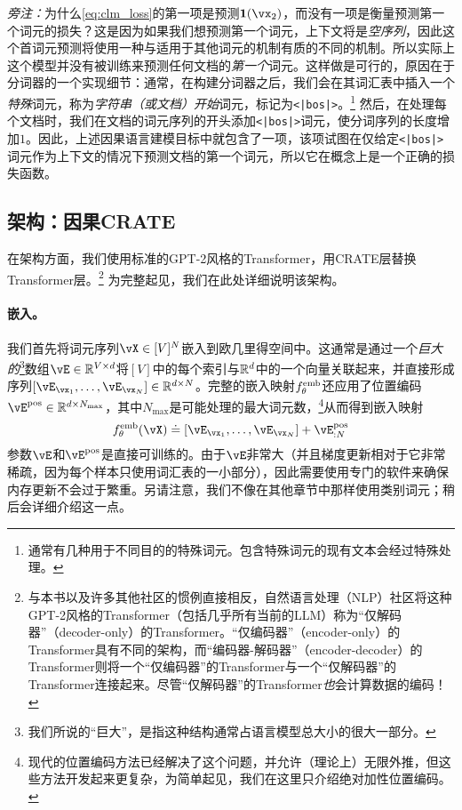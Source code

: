 \documentclass[../../book-main.tex]{subfiles}
\begin{document}
\textit{旁注：}为什么\eqref{eq:clm_loss}的第一项是预测\(\vone(\vx_{2})\)，而没有一项是衡量预测第一个词元的损失？这是因为如果我们想预测第一个词元，上下文将是\textit{空序列}，因此这个首词元预测将使用一种与适用于其他词元的机制有质的不同的机制。所以实际上这个模型并没有被训练来预测任何文档的\textit{第一个}词元。这样做是可行的，原因在于分词器的一个实现细节：通常，在构建分词器之后，我们会在其词汇表中插入一个\textit{特殊}词元，称为\textit{字符串（或文档）开始}词元，标记为\texttt{<|bos|>}。\footnote{通常有几种用于不同目的的特殊词元。包含特殊词元的现有文本会经过特殊处理。} 然后，在处理每个文档时，我们在文档的词元序列的开头添加\texttt{<|bos|>}词元，使分词序列的长度增加\(1\)。因此，上述因果语言建模目标中就包含了一项，该项试图在仅给定\texttt{<|bos|>}词元作为上下文的情况下预测文档的第一个词元，所以它在概念上是一个正确的损失函数。

\subsection{架构：因果CRATE}

在架构方面，我们使用标准的GPT-2风格的Transformer，用CRATE层替换Transformer层。\footnote{与本书以及许多其他社区的惯例直接相反，自然语言处理（NLP）社区将这种GPT-2风格的Transformer（包括几乎所有当前的LLM）称为“仅解码器”（decoder-only）的Transformer。“仅编码器”（encoder-only）的Transformer具有不同的架构，而“编码器-解码器”（encoder-decoder）的Transformer则将一个“仅编码器”的Transformer与一个“仅解码器”的Transformer连接起来。尽管“仅解码器”的Transformer\textit{也}会计算数据的编码！} 为完整起见，我们在此处详细说明该架构。

\paragraph{嵌入。} 我们首先将词元序列\(\vX \in [V]^{N}\)嵌入到欧几里得空间中。这通常是通过一个\textit{巨大的}\footnote{我们所说的“巨大”，是指这种结构通常占语言模型总大小的很大一部分。}数组\(\vE \in \R^{V \times d}\)将\([V]\)中的每个索引与\(\mathbb{R}^{d}\)中的一个向量关联起来，并直接形成序列\([\vE_{\vx_{1}}, \dots, \vE_{\vx_{N}}] \in \R^{d \times N}\)。完整的嵌入映射\(f_{\theta}^{\mathrm{emb}}\)还应用了位置编码\(\vE^{\pos} \in \R^{d  \times N_{\max}}\)，其中\(N_{\max}\)是可能处理的最大词元数，\footnote{现代的位置编码方法已经解决了这个问题，并允许（理论上）无限外推，但这些方法开发起来更复杂，为简单起见，我们在这里只介绍绝对加性位置编码。}从而得到嵌入映射
\begin{equation}
    f_{\theta}^{\emb}(\vX) \doteq [\vE_{\vx_{1}}, \dots, \vE_{\vx_{N}}] + \vE_{:N}^{\pos}
\end{equation}
参数\(\vE\)和\(\vE^{\pos}\)是直接可训练的。由于\(\vE\)非常大（并且梯度更新相对于它非常稀疏，因为每个样本只使用词汇表的一小部分），因此需要使用专门的软件来确保内存更新不会过于繁重。另请注意，我们不像在其他章节中那样使用类别词元；稍后会详细介绍这一点。
\end{document}
